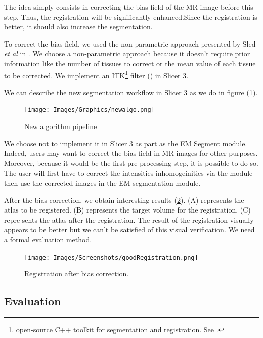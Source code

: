 The idea simply consists in correcting the bias field of the MR image before this step. Thus, the registration will be significantly enhanced.Since the registration is better, it should also increase the segmentation.
\par
To correct the bias field, we used the non-parametric approach presented by Sled \textit{et al} in \cite{19}. We choose a non-parametric approach because it doesn't require prior information like the number of tissues to correct or the mean value of each tissue to be corrected. We implement an ITK\footnote{open-source C++ toolkit for segmentation and registration. See \cite{13}.} filter (\cite{14}) in Slicer 3. 
\par
We can describe the new segmentation workflow in Slicer 3 as we do in figure (\ref{fig:wfwbc}).

\begin{figure}[ht]\centering
  \texttt{[image: Images/Graphics/newalgo.png]}
  \caption{New algorithm pipeline}\label{fig:wfwbc}
  \end{figure}

\par
We choose not to implement it in Slicer 3 as part as the EM Segment module. Indeed, users may want to correct the bias field in MR images for other purposes. Moreover, because it would be the first pre-processing step, it is possible to do so. The user will first have to correct the intensities inhomogeinities via the module then use the corrected images in the EM segmentation module.

  
  
\par
After the bias correction, we obtain interesting results (\ref{fig:goodRegistration}). (A) represents the atlas to be registered. (B) represents the target volume for the registration. (C) repre sents the atlas after the registration. The result of the registration visually appears to be better but we can't be satisfied of this visual verification. We need a formal evaluation method.

\begin{figure}\centering
  \texttt{[image: Images/Screenshots/goodRegistration.png]}
  \caption{Registration after bias correction.}\label{fig:goodRegistration}
\end{figure}

\subsection{Evaluation}

